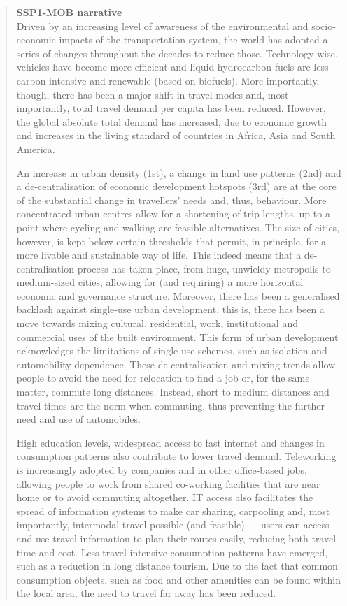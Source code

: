 \blockquote{\sffamily \textbf{SSP1-MOB narrative}\\Driven by an increasing level of awareness of the environmental and socio-economic impacts of the transportation system, the world has adopted a series of changes throughout the decades to reduce those. Technology-wise, vehicles have become more efficient and liquid hydrocarbon fuels are less carbon intensive and renewable (based on biofuels). More importantly, though, there has been a major shift in travel modes and, most importantly, total travel demand per capita has been reduced. However, the global absolute total demand has increased, due to economic growth and increases in the living standard of countries in Africa, Asia and South America.

An increase in urban density (1st), a change in land use patterns (2nd) and a de-centralisation of economic development hotspots (3rd) are at the core of the substantial change in travellers' needs and, thus, behaviour. More concentrated urban centres allow for a shortening of trip lengths, up to a point where cycling and walking are feasible alternatives. The size of cities, however, is kept below certain thresholds that permit, in principle, for a more livable and sustainable way of life. This indeed means that a de-centralisation process has taken place, from huge, unwieldy metropolis to medium-sized cities, allowing for (and requiring) a more horizontal economic and governance structure. Moreover, there has been a generalised backlash against single-use urban development, this is, there has been a move towards mixing cultural, residential, work, institutional and commercial uses of the built environment. This form of urban development acknowledges the limitations of single-use schemes, such as isolation and automobility dependence. These de-centralisation and mixing trends allow people to avoid the need for relocation to find a job or, for the same matter, commute long distances. Instead, short to medium distances and travel times are the norm when commuting, thus preventing the further need and use of automobiles.

High education levels, widespread access to fast internet and changes in consumption patterns also contribute to lower travel demand. Teleworking is increasingly adopted by companies and in other office-based jobs, allowing people to work from shared co-working facilities that are near home or to avoid commuting altogether. IT access also facilitates the spread of information systems to make car sharing, carpooling and, most importantly, intermodal travel possible (and feasible) --- users can access and use travel information to plan their routes easily, reducing both travel time and cost. Less travel intensive consumption patterns have emerged, such as a reduction in long distance tourism. Due to the fact that common consumption objects, such as food and other amenities can be found within the local area, the need to travel far away has been reduced.

}
